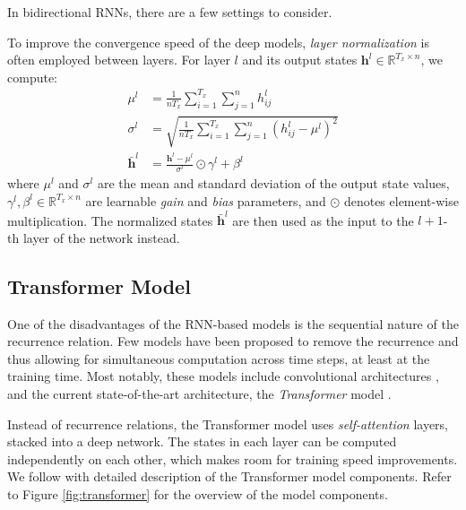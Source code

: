 In bidirectional RNNs, there are a few settings to consider. 

  To improve the convergence
speed of the deep models, \emph{layer normalization} \citep{ba2016layer} is
often employed between layers. For layer $l$ and its output states
$\mathbf{h}^l \in \mathbb{R}^{T_x \times n}$, we compute:
%
\begin{align}
  \mu^l &= \frac{1}{nT_x} \sum_{i=1}^{T_x}\sum_{j=1}^n h^l_{ij} \\
  \sigma^l &= \sqrt{\frac{1}{nT_x} \sum_{i=1}^{T_x}\sum_{j=1}^n (h^l_{ij} - \mu^l)^2} \\
  \bar{\mathbf{h}}^l &= \frac{\mathbf{h}^l - \mu^l}{\sigma^l} \odot \gamma^l + \beta^l
\end{align}
%
where $\mu^l$ and $\sigma^l$ are the mean and standard deviation of the output
state values, $\gamma^l, \beta^l \in \mathbb{R}^{T_x \times n}$ are learnable
\emph{gain} and \emph{bias} parameters, and $\odot$ denotes element-wise
multiplication. The normalized states $\bar{\mathbf{h}}^l$ are then used as the
input to the $l+1$-th layer of the network instead.




\subsection{Transformer Model}
\label{sec:encdec:transformer}

One of the disadvantages of the RNN-based models is the sequential nature of
the recurrence relation. Few models have been proposed to remove the recurrence
and thus allowing for simultaneous computation across time steps, at least at
the training time. Most notably, these models include convolutional
architectures \citep{gehring2017convolutional}, and the current
state-of-the-art architecture, the \emph{Transformer} model
\citep{vaswani2017attention}.

Instead of recurrence relations, the Transformer model uses
\emph{self-attention} layers, stacked into a deep network. The states in each
layer can be computed independently on each other, which makes room for
training speed improvements. We follow with detailed description of the
Transformer model components. Refer to Figure \ref{fig:transformer} for
the overview of the model components.

